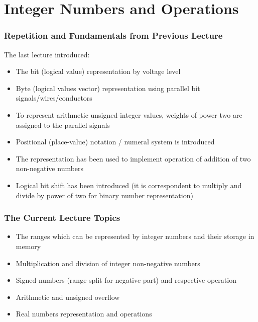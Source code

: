 \documentclass{beamer}
\subtitle{Lecture 02. Integer and Floating Point Numbers}
\author{Pavel Píša \phantom{xxxxxxxxx} Petr Štěpán \\ \small\texttt{pisa@fel.cvut.cz} \phantom{xx} \small\texttt{stepan@fel.cvut.cz} \\
\phantom{xxxxxxxxx} \\
License: CC-BY-SA}
\begin{document}
\maketitle

\section{Integer Numbers and Operations}

\begin{frame}
\frametitle{Repetition and Fundamentals from Previous Lecture}
The last lecture introduced:
\begin{itemize}
\item The bit (logical value) representation by voltage level
\item Byte (logical values vector) representation using parallel bit signals/wires/conductors
\item To represent arithmetic unsigned integer values, weights of power two are assigned to the parallel signals
\item Positional (place-value) notation / numeral system is introduced
\item The representation has been used to implement operation of addition of two non-negative numbers
\item Logical bit shift has been introduced (it is correspondent to multiply and divide by power of two for binary number representation)
\end{itemize}
\end{frame}


\begin{frame}
\frametitle{The Current Lecture Topics}
\begin{itemize}
\item The ranges which can be represented by integer numbers and their storage in memory
\item Multiplication and division of integer non-negative numbers
\item Signed numbers (range split for negative part) and respective operation
\item Arithmetic and unsigned overflow
\item Real numbers representation and operations
\end{itemize}
\end{frame}
\end{document}
